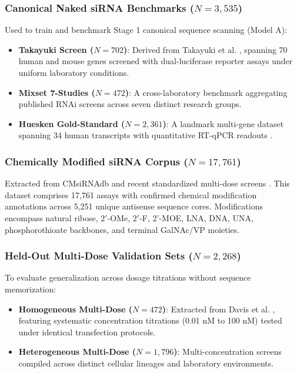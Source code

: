 \documentclass[twocolumn]{article}
\begin{document}
\subsubsection{Canonical Naked siRNA Benchmarks ($N = 3{,}535$)}
Used to train and benchmark Stage 1 canonical sequence scanning (Model A):
\begin{itemize}
    \item \textbf{Takayuki Screen ($N = 702$)}: Derived from Takayuki et al. \cite{takayuki2013sirna}, spanning 70 human and mouse genes screened with dual-luciferase reporter assays under uniform laboratory conditions.
    \item \textbf{Mixset 7-Studies ($N = 472$)}: A cross-laboratory benchmark aggregating published RNAi screens across seven distinct research groups.
    \item \textbf{Huesken Gold-Standard ($N = 2{,}361$)}: A landmark multi-gene dataset spanning 34 human transcripts with quantitative RT-qPCR readouts \cite{huesken2005design}.
\end{itemize}

\subsubsection{Chemically Modified siRNA Corpus ($N = 17{,}761$)}
Extracted from CMsiRNAdb and recent standardized multi-dose screens \cite{davis2025nar}. This dataset comprises 17,761 assays with confirmed chemical modification annotations across 5,251 unique antisense sequence cores. Modifications encompass natural ribose, $2'$-OMe, $2'$-F, 2'-MOE, LNA, DNA, UNA, phosphorothioate backbones, and terminal GalNAc/VP moieties.

\subsubsection{Held-Out Multi-Dose Validation Sets ($N = 2{,}268$)}
To evaluate generalization across dosage titrations without sequence memorization:
\begin{itemize}
    \item \textbf{Homogeneous Multi-Dose ($N = 472$)}: Extracted from Davis et al. \cite{davis2025nar}, featuring systematic concentration titrations (0.01 nM to 100 nM) tested under identical transfection protocols.
    \item \textbf{Heterogeneous Multi-Dose ($N = 1{,}796$)}: Multi-concentration screens compiled across distinct cellular lineages and laboratory environments.
\end{itemize}
\end{document}
